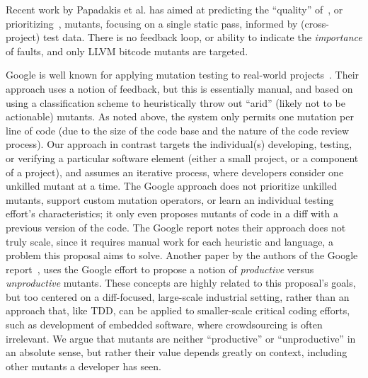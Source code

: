 Recent work by Papadakis et al. has
aimed at predicting the ``quality'' of~\cite{MutQuality},
or prioritizing~\cite{FaRM}, mutants, focusing on a single static
pass, informed by
(cross-project) test data.  There is no feedback loop, or ability
to indicate the \emph{importance} of faults, and only LLVM
bitcode mutants are targeted.  %

Google is well known for applying mutation
testing to real-world projects~\cite{MutGoogle}.  Their approach 
uses a notion of feedback, but this is  essentially manual, and based on
using a classification scheme to heuristically throw out ``arid''
(likely not to be actionable)
mutants. As noted above, the system only permits one mutation per line of code
(due to the size of the code base and the nature of the code review process). 
Our approach in contrast targets the individual(s) developing, testing, or verifying a particular software
element (either a small project, or a component of a project), and
assumes an iterative process, where developers consider one unkilled
mutant at a time.  The Google approach does not prioritize
unkilled mutants, support custom mutation
operators, or learn an individual testing effort's characteristics; it only even
proposes mutants of code in a diff with a previous version of the
code.  
The Google report
notes their approach does not truly scale, since it
requires manual work for each heuristic and language, a
problem this proposal aims to solve.
Another paper by the
authors of the Google report~\cite{ivankovic2018industrial}, uses the Google effort to
propose a notion of \emph{productive} versus \emph{unproductive} mutants.  These
concepts are highly related to this proposal's goals, but too centered on a
diff-focused, large-scale industrial setting, rather than an approach
that, like TDD, can be applied to smaller-scale critical coding efforts, such as development of embedded software, where
crowdsourcing is often irrelevant.  
We argue that mutants
are neither ``productive'' or ``unproductive'' in an absolute sense, but
rather their value depends greatly on context, including other mutants a
developer has seen.


